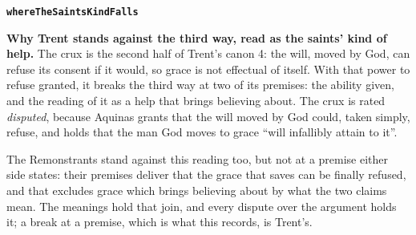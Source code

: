 \documentclass[11pt]{article}
\begin{document}
\par\medskip\noindent\textbf{\texttt{where\allowbreak{}The\allowbreak{}Saints\allowbreak{}Kind\allowbreak{}Falls}}\par\nobreak\noindent
\textbf{Why Trent stands against the third way, read as the saints’ kind of help.} The crux is the second half of Trent’s canon 4: the will, moved by God, can refuse its consent if it would, so grace is not effectual of itself. With that power to refuse granted, it breaks the third way at two of its premises: the ability given, and the reading of it as a help that brings believing about. The crux is rated \emph{disputed}, because Aquinas grants that the will moved by God could, taken simply, refuse, and holds that the man God moves to grace “will infallibly attain to it”.

The Remonstrants stand against this reading too, but not at a premise either side states: their premises deliver that the grace that saves can be finally refused, and that excludes grace which brings believing about by what the two claims mean. The meanings hold that join, and every dispute over the argument holds it; a break at a premise, which is what this records, is Trent’s.
\end{document}
